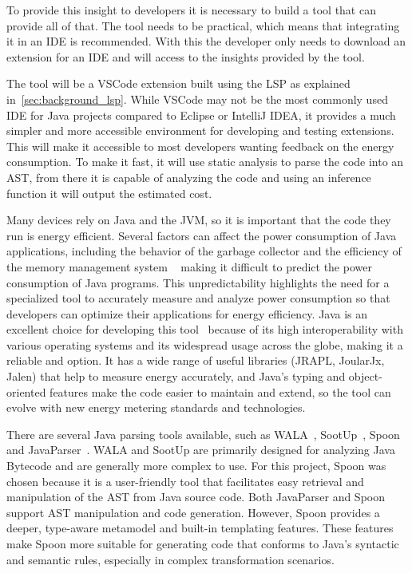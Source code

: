To provide this insight to developers it is necessary to build a tool that can provide all of that. The tool needs to be practical, which means that integrating it in an IDE is recommended. With this the developer only needs to download an extension for an IDE and will access to the insights provided by the tool.

The tool will be a VSCode extension  built using the LSP as explained in~\ref{sec:background_lsp}. While VSCode may not be the most commonly used IDE for Java projects compared to Eclipse or IntelliJ IDEA, it provides a much simpler and more accessible environment for developing and testing extensions. This will make it accessible to most developers wanting feedback on the energy consumption. To make it fast, it will use static analysis to parse the code into an AST, from there it is capable of analyzing the code and using an inference function it will output the estimated cost.




Many devices rely on Java and the JVM, so it is important that the code they run is energy efficient. Several factors can affect the power consumption of Java applications, including the behavior of the garbage collector and the efficiency of the memory management system ~\cite{10.5555/1267847.1267870} making it difficult to predict the power consumption of Java programs. This unpredictability highlights the need for a specialized tool to accurately measure and analyze power consumption so that developers can optimize their applications for energy efficiency.
Java is an excellent choice for developing this tool~ because of its high interoperability with various operating systems and its widespread usage across the globe, making it a reliable and option. It has a wide range of useful libraries (JRAPL, JoularJx, Jalen) that help to measure energy accurately, and Java's typing and object-oriented features make the code easier to maintain and extend, so the tool can evolve with new energy metering standards and technologies. 

There are several Java parsing tools available, such as WALA~\cite{wala_main}, SootUp~\cite{sootup_main}, Spoon~\cite{spoon_main} and JavaParser~\cite{javaParser}. WALA and SootUp are primarily designed for analyzing Java Bytecode and are generally more complex to use. For this project, Spoon was chosen because it is a user-friendly tool that facilitates easy retrieval and manipulation of the AST from Java source code. Both JavaParser and Spoon support AST manipulation and code generation. However, Spoon provides a deeper, type-aware metamodel and built-in templating features. These features make Spoon more suitable for generating code that conforms to Java’s syntactic and semantic rules, especially in complex transformation scenarios.


